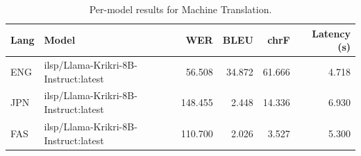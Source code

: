 \begin{table}[t]
\centering
\caption{Per-model results for Machine Translation.}
\label{tab:appendix-machine-translation-analysis}
\begin{tabular}{llrrrr}
\toprule
Lang & Model & WER & BLEU & chrF & Latency (s) \\
\midrule
ENG & ilsp/Llama-Krikri-8B-Instruct:latest & 56.508 & 34.872 & 61.666 & 4.718 \\
JPN & ilsp/Llama-Krikri-8B-Instruct:latest & 148.455 & 2.448 & 14.336 & 6.930 \\
FAS & ilsp/Llama-Krikri-8B-Instruct:latest & 110.700 & 2.026 & 3.527 & 5.300 \\
\bottomrule
\end{tabular}
\end{table}
